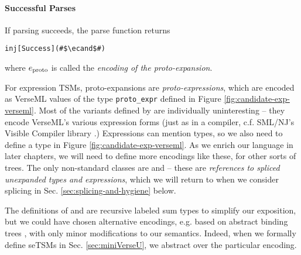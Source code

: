 

\paragraph{Successful Parses} If parsing succeeds, the parse function returns 
\begin{lstlisting}[numbers=none]
inj[Success](#$\ecand$#)
\end{lstlisting} 
where $e_\text{proto}$ is called the \emph{encoding of the proto-expansion}. 

For expression TSMs, proto-expansions are \emph{proto-expressions}, which are encoded as VerseML values of the type \lstinline{proto_expr} defined in Figure \ref{fig:candidate-exp-verseml}.
Most of the variants defined by  are individually uninteresting -- they encode VerseML's various expression forms (just as in a compiler, c.f. SML/NJ's Visible Compiler library \cite{SML/VisibleCompiler}.) 
Expressions can mention types, so we also need to define a type  in Figure \ref{fig:candidate-exp-verseml}. As we enrich our language in later chapters, we will need to define more encodings like these, for other sorts of trees. The only non-standard classes are  and  -- these are \emph{references to spliced unexpanded types and expressions}, which we will return to when we consider splicing in Sec. \ref{sec:splicing-and-hygiene} below. 

The definitions of  and  are recursive labeled sum types to simplify our exposition, but we could have chosen alternative encodings, e.g. based on abstract binding trees \cite{pfpl}, with only minor modifications to our semantics. Indeed, when we formally define seTSMs in Sec. \ref{sec:miniVerseU}, we abstract over the particular encoding.





